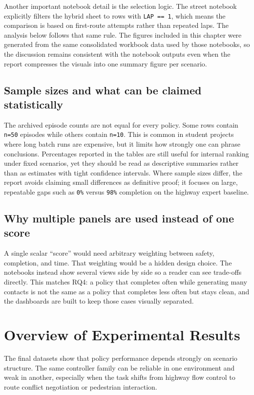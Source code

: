 \documentclass[12pt,a4paper]{report}
\begin{document}
Another important notebook detail is the selection logic. The street notebook explicitly filters the hybrid sheet to rows with \texttt{LAP == 1}, which means the comparison is based on first-route attempts rather than repeated laps. The analysis below follows that same rule. The figures included in this chapter were generated from the same consolidated workbook data used by those notebooks, so the discussion remains consistent with the notebook outputs even when the report compresses the visuals into one summary figure per scenario.

\subsection{Sample sizes and what can be claimed statistically}
The archived episode counts are not equal for every policy. Some rows contain \texttt{n=50} episodes while others contain \texttt{n=10}. This is common in student projects where long batch runs are expensive, but it limits how strongly one can phrase conclusions. Percentages reported in the tables are still useful for internal ranking under fixed scenarios, yet they should be read as descriptive summaries rather than as estimates with tight confidence intervals. Where sample sizes differ, the report avoids claiming small differences as definitive proof; it focuses on large, repeatable gaps such as \texttt{0\%} versus \texttt{98\%} completion on the highway expert baseline.

\subsection{Why multiple panels are used instead of one score}
A single scalar ``score'' would need arbitrary weighting between safety, completion, and time. That weighting would be a hidden design choice. The notebooks instead show several views side by side so a reader can see trade-offs directly. This matches RQ4: a policy that completes often while generating many contacts is not the same as a policy that completes less often but stays clean, and the dashboards are built to keep those cases visually separated.

\section{Overview of Experimental Results}
The final datasets show that policy performance depends strongly on scenario structure. The same controller family can be reliable in one environment and weak in another, especially when the task shifts from highway flow control to route conflict negotiation or pedestrian interaction.
\end{document}
